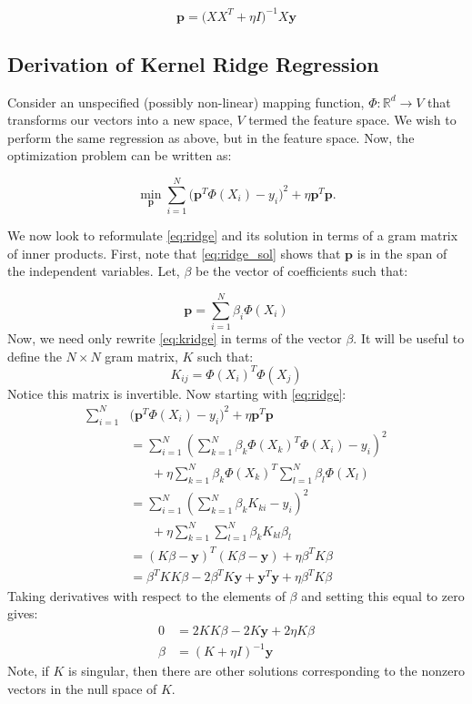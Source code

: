 \documentclass[aip, jcp, url, amsmath, amssymb,
 longbibliography, nofootinbib,
reprint,
]{revtex4-1}
\begin{document}
\begin{equation}
\label{eq:ridge_sol}
\mathbf{p} = \big(X X^T + \eta I)^{-1} X \mathbf{y}
\end{equation}

\subsection{Derivation of Kernel Ridge Regression}

Consider an unspecified (possibly non-linear) mapping function, $\Phi : \mathbb{R}^d \to V$ that transforms our vectors into a new space, $V$ termed the feature space. We wish to perform the same regression as above, but in the feature space. Now, the optimization problem can be written as:

\begin{equation}
\label{eq:kridge}
\min_{\mathbf{p}} \sum_{i=1}^N \Big(\mathbf{p}^T \Phi(X_i) - y_i\Big)^2 + \eta \mathbf{p}^T\mathbf{p}.
\end{equation}

We now look to reformulate \cref{eq:ridge} and its solution in terms of a gram matrix of inner products. First, note that \cref{eq:ridge_sol} shows that $\mathbf{p}$ is in the span of the independent variables. Let, $\beta$ be the vector of coefficients such that:

$$ \mathbf{p} = \sum_{i=1}^N \beta_i \Phi(X_i) $$ Now, we need only rewrite \cref{eq:kridge} in terms of the vector $\beta$. It will be useful to define the $N \times N$ gram matrix, $K$ such that:
$$K_{ij} = \Phi(X_i)^T \Phi(X_j)$$ Notice this matrix is invertible. Now starting with \cref{eq:ridge}:
\begin{align*}
\sum_{i=1}^N &\Big(\mathbf{p}^T \Phi(X_i) - y_i\Big)^2 + \eta \mathbf{p}^T\mathbf{p} \\
	&= \sum_{i=1}^N \left(\sum_{k=1}^N \beta_k \Phi(X_k)^T \Phi(X_i) - y_i\right)^2 \\ 
	&\;\;\;\;\;\;+ \eta \sum_{k=1}^N \beta_k \Phi(X_k)^T \sum_{l=1}^N \beta_l \Phi(X_l) \\
	&= \sum_{i=1}^N \left(\sum_{k=1}^N \beta_k K_{ki} - y_i\right)^2 \\ 
	&\;\;\;\;\;\;+ \eta \sum_{k=1}^N \sum_{l=1}^N \beta_k K_{kl} \beta_l \\
	&= \left( K \beta - \mathbf{y} \right)^T \left( K \beta - \mathbf{y} \right) + \eta \beta^T K \beta \\
	&= \beta^T KK \beta - 2 \beta^T K \mathbf{y} + \mathbf{y}^T \mathbf{y} + \eta \beta^T K \beta 
\end{align*} Taking derivatives with respect to the elements of $\beta$ and setting this equal to zero gives:
\begin{align*}
0 &= 2 KK \beta - 2 K \mathbf{y} + 2 \eta K \beta \\
\beta &= \left(K + \eta I\right)^{-1} \mathbf{y}
\end{align*} Note, if $K$ is singular, then there are other solutions corresponding to the nonzero vectors in the null space of $K$. 
\end{document}

